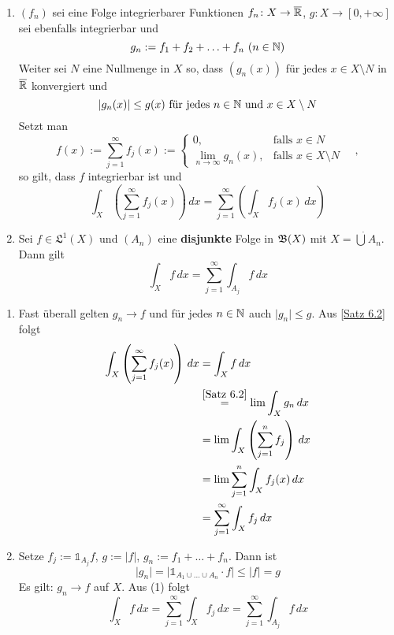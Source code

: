 \documentclass[a4paper,twoside,DIV15,BCOR12mm,chapterprefix=true,headings=onelinechapter]{scrbook}
\begin{document}
\begin{folgerung}
\label{Folgerung 6.4}
\begin{enumerate}
	\item 	\((f_n)\) sei eine Folge integrierbarer Funktionen \(f_n\colon X\to\overline{\mathbb{R}}\), \(g\colon X\to[0,+\infty]\) sei ebenfalls integrierbar und 
		\[g_n:=f_1+f_2+\ldots+f_n \ (n\in\mathbb{N})\]
		Weiter sei $N$ eine Nullmenge in $X$ so, dass \((g_n(x))\) für jedes \(x\in X\setminus N\) in $\overline{\mathbb{R}}$  konvergiert und 
		\[\lvert g_n(x)\rvert \leq g(x) \text{ für jedes } n\in\mathbb{N} \text{ und } x\in X\setminus N\]
		Setzt man
		\[f(x):=\sum^\infty_{j=1}f_j(x):=	
		\begin{cases}
			0, 				& \text{falls } x\in N 			\\
			\lim\limits_{n\to\infty}g_n(x), & \text{falls } x\in X\setminus N
		\end{cases}\quad,\]
		so gilt, dass $f$ integrierbar ist und
		\[\int_X \left( \sum^\infty_{j=1}f_j(x) \right)\,dx = \sum^\infty_{j=1}\left( \int_Xf_j(x)\,dx \right) \]
	\item 	Sei \(f\in\mathfrak{L}^1(X)\) und \((A_n)\) eine \textbf{disjunkte} Folge in \(\mathfrak{B}(X)\) mit \(X=\dot\bigcup A_n\). Dann gilt
		\[\int_Xf\,dx = \sum^\infty_{j=1}\int_{A_j}f\,dx \]
\end{enumerate}
\end{folgerung}

\begin{beweis}
\begin{enumerate}
	\item 	Fast überall gelten \(g_n\to f\) und für jedes \(n\in\mathbb{N}\) auch \(\lvert g_n\rvert \leq g\). Aus \ref{Satz 6.2} folgt
		\begin{align*}
			\int_X \left(\sum^\infty_{j=1}f_j(x)\right) \,dx 
			&= \int_Xf\,dx  					\\
			&\overset{\ref{Satz 6.2}}= \lim\int_Xg_n\,dx 	\\
			&= \lim\int_X\left(\sum^n_{j=1}f_j\right)\,dx 	\\
			&=\lim\sum^n_{j=1}\int_Xf_j(x)\,dx 			\\
			&=\sum^\infty_{j=1}\int_Xf_j\,dx 			\\
		\end{align*}
	\item 	Setze \(f_j:=\mathds{1}_{A_j}f\), \(g:=\lvert f\rvert\), \(g_n:=f_1+\ldots+f_n\). Dann ist
		\[\lvert g_n\rvert = \lvert \mathds{1}_{A_1\cup\ldots\cup A_n}\cdot f\rvert \leq \lvert f\rvert =g \]
		Es gilt: \(g_n\to f\) auf $X$. Aus (1) folgt
		\[ \int_Xf\,dx = \sum^\infty_{j=1}\int_Xf_j\,dx = \sum^\infty_{j=1}\int_{A_j}f\,dx \]
\end{enumerate}
\end{beweis}
\end{document}
